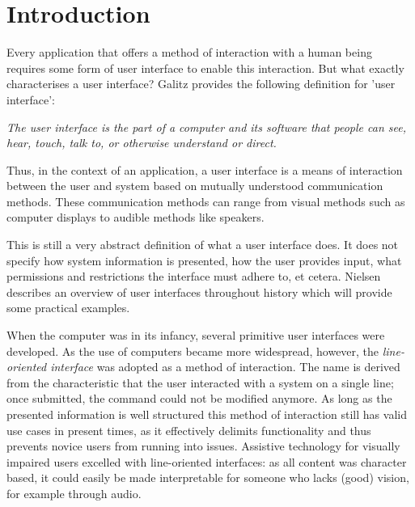 \chapter{Introduction}
\label{chapter:introduction}
Every application that offers a method of interaction with a human being requires some form of user interface to enable this interaction. But what exactly characterises a user interface? Galitz\cite{galitz2007essential} provides the following definition for 'user interface':
\begin{displayquote}
\textit{The user interface is the part of a computer and its software that people can see, hear, touch, talk to, or otherwise understand or direct.}
\end{displayquote}

Thus, in the context of an application, a user interface is a means of interaction between the user and system based on mutually understood communication methods. These communication methods can range from visual methods such as computer displays to audible methods like speakers. 

This is still a very abstract definition of what a user interface does. It does not specify how system information is presented, how the user provides input, what permissions and restrictions the interface must adhere to, et cetera. Nielsen\cite{nielsen1994usability} describes an overview of user interfaces throughout history which will provide some practical examples.

When the computer was in its infancy, several primitive user interfaces were developed. As the use of computers became more widespread, however, the \textit{line-oriented interface} was adopted as a method of interaction. The name is derived from the characteristic that the user interacted with a system on a single line; once submitted, the command could not be modified anymore. As long as the presented information is well structured this method of interaction still has valid use cases in present times, as it effectively delimits functionality and thus prevents novice users from running into issues. Assistive technology for visually impaired users excelled with line-oriented interfaces: as all content was character based, it could easily be made interpretable for someone who lacks (good) vision, for example through audio\cite{poll1996visualising}.

